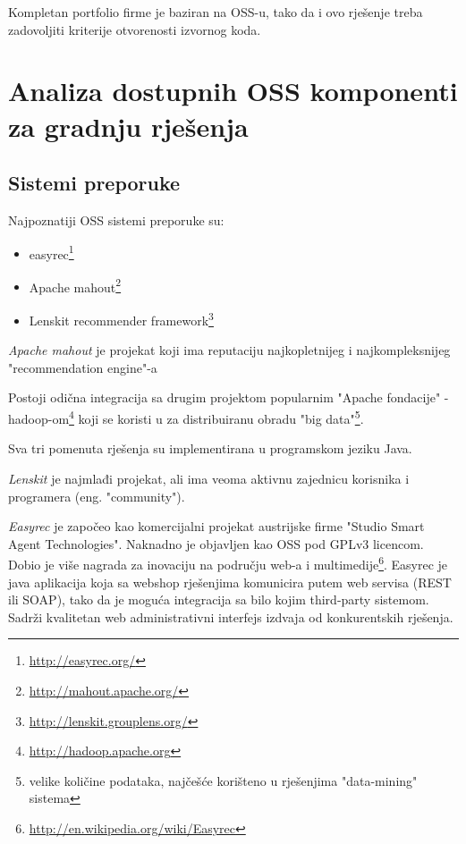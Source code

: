 \documentclass[times, utf8, seminar]{fit}
\begin{document}
Kompletan portfolio firme je baziran na OSS-u, tako da i ovo rješenje treba zadovoljiti kriterije otvorenosti izvornog koda.

\chapter{Analiza dostupnih OSS komponenti za gradnju rješenja}
\vspace*{-0.7cm}

\section{Sistemi preporuke}

Najpoznatiji OSS sistemi preporuke su:

\begin{itemize}
  \item easyrec\footnote{\url{http://easyrec.org/}}
  \item Apache mahout\footnote{\url{http://mahout.apache.org/}}
  \item Lenskit recommender framework\footnote{\url{http://lenskit.grouplens.org/}}
\end{itemize}

\emph{Apache mahout} je projekat koji ima reputaciju najkopletnijeg i najkompleksnijeg "recommendation engine"-a 

Postoji odična integracija sa drugim projektom popularnim "Apache fondacije" - hadoop-om\footnote{\url{http://hadoop.apache.org}} koji se koristi u za distribuiranu obradu "big data"\footnote{velike količine podataka, najčešće korišteno u  rješenjima "data-mining" sistema}.

Sva tri pomenuta rješenja su implementirana u programskom jeziku Java.

\emph{Lenskit} je najmlađi projekat, ali ima veoma aktivnu zajednicu korisnika i programera (eng. "community").

\emph{Easyrec} je započeo kao komercijalni projekat austrijske firme "Studio Smart Agent Technologies". Naknadno je objavljen kao OSS pod GPLv3 licencom. 
Dobio je više nagrada za inovaciju na području web-a i multimedije\footnote{\url{http://en.wikipedia.org/wiki/Easyrec}}. 
Easyrec je java aplikacija koja sa webshop rješenjima komunicira putem web servisa (REST ili SOAP), tako da je moguća integracija sa bilo kojim third-party sistemom.
Sadrži kvalitetan web administrativni interfejs izdvaja od konkurentskih rješenja.
\end{document}
